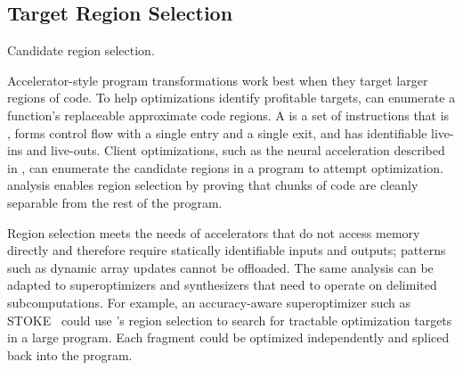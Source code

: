 \iffalse  %
Each program-relaxation strategy uses the shared \precisepurity analysis to
identify \emph{relaxation-opportunity sites:} places where the transformation
can apply. When \sysname finds an opportunity site, it registers the site along
with any relevant parameters in its catalog of such sites. The autotuner then
uses this catalog to enable a subset of relaxation opportunities and set their
parameters.  Section~\ref{accept:sec:autotuner} describes the autotuning process in more detail.
\fi

\subsection{Target Region Selection}
\label{accept:subsec:regions}

\begin{algorithm}[tb]
  \DontPrintSemicolon

   {
     {
    }
  }
\caption{Candidate region selection.}
\label{accept:alg:regionSel}
\end{algorithm}

Accelerator-style program transformations work best when they target larger
regions of code.
To help optimizations identify profitable targets,
\sysname can enumerate a
function's replaceable approximate code regions.
%
A  is a set of instructions that is \precisepure, forms
control flow with a single entry and a single exit, and has identifiable live-ins
and live-outs.
%
Client optimizations, such as the neural acceleration described in
, can enumerate the candidate regions in a program to attempt
optimization.  \Precisepurity analysis enables region selection by proving
that chunks of code are cleanly separable from the rest of the program.

Region selection meets the needs of accelerators that do not access memory
directly and therefore require statically identifiable inputs and outputs;
patterns such as dynamic array updates cannot be offloaded.  The same analysis
can be adapted to superoptimizers and synthesizers that need to operate on
delimited subcomputations.
%
For example, an accuracy-aware superoptimizer such as
STOKE~\cite{stoke-fp} could use \sysname's region selection to search for
tractable optimization targets in a large program.
Each fragment could be optimized independently
and spliced back into the program.

